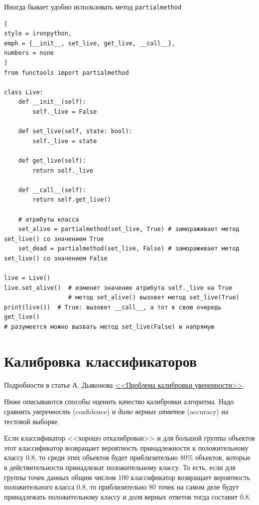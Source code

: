 \documentclass[%
	11pt,
	a4paper,
	utf8,
		]{article}
\begin{document}
Иногда бывает удобно использовать метод \texttt{partialmethod}
\begin{lstlisting}[
style = ironpython,
emph = {__init__, set_live, get_live, __call__},
numbers = none	
]
from functools import partialmethod

class Live:
    def __init__(self):
        self._live = False
        
    def set_live(self, state: bool):
        self._live = state
        
    def get_live(self):
        return self._live
        
    def __call__(self):
        return self.get_live()
    
    # атрибуты класса    
    set_alive = partialmethod(set_live, True) # замораживает метод set_live() со значением True
    set_dead = partialmethod(set_live, False) # замораживает метод set_live() со значением False
    
live = Live()
live.set_alive()  # изменит значение атрибута self._live на True
                  # метод set_alive() вызовет метод set_live(True)
print(live())  # True: вызовет __call__, а тот в свою очередь get_live()
# разумеется можно вызвать метод set_live(False) и напрямую
\end{lstlisting}



\section{Калибровка классификаторов}

Подробности в статье А. Дьяконова \href{https://dyakonov.org/2020/03/27/%D0%BF%D1%80%D0%BE%D0%B1%D0%BB%D0%B5%D0%BC%D0%B0-%D0%BA%D0%B0%D0%BB%D0%B8%D0%B1%D1%80%D0%BE%D0%B2%D0%BA%D0%B8-%D1%83%D0%B2%D0%B5%D1%80%D0%B5%D0%BD%D0%BD%D0%BE%D1%81%D1%82%D0%B8/}{<<Проблема калибровки уверенности>>}.
\vspace{2mm}

Ниже описываются способы оценить качество калибровки алгоритма. Надо сравнить \emph{уверенность} (confidence) и \emph{долю верных ответов} (accuracy) на тестовой выборке.

Если классификатор <<хорошо откалиброван>> и для большой группы объектов этот классификатор возвращает вероятность принадлежности к положительному классу 0.8, то среди этих объектов будет приблизительно 80\% объектов, которые в действительности принадлежат положительному классу. То есть, если для группы точек данных общим числом 100 классификатор возвращает вероятность положительного класса 0.8, то приблизительно 80 точек на самом деле будут принадлежать положительному классу и доля верных ответов тогда составит 0.8.
\end{document}

